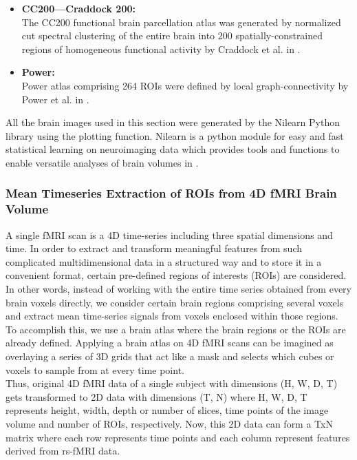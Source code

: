 \begin{itemize}
\item \textbf{CC200—Craddock 200:} \\
The CC200 functional brain parcellation atlas was generated by normalized cut
spectral clustering of the entire brain into 200 spatially-constrained regions of
homogeneous functional activity by Craddock et al. in \cite{craddock2012whole}.

\item \textbf{Power:} \\
Power atlas comprising 264 ROIs were defined by local graph-connectivity by Power
et al. in \cite{power2011functional}.
\end{itemize}

All the brain images used in this section were generated by the Nilearn Python library using
the plotting function. Nilearn is a python module for easy and fast statistical learning on
neuroimaging data which provides tools and functions to enable versatile analyses of brain
volumes in \cite{nilearn}.

\subsubsection{Mean Timeseries Extraction of ROIs from 4D fMRI Brain Volume}
A single fMRI scan is a 4D time-series including three spatial dimensions and time. In order to extract
and transform meaningful features from such complicated multidimensional data in a
structured way and to store it in a convenient format, certain pre-defined regions of interests
(ROIs) are considered.\\

In other words, instead of working with the entire time series obtained from every brain
voxels directly, we consider certain brain regions comprising several voxels and extract mean
time-series signals from voxels enclosed within those regions. To accomplish this, we use a
brain atlas where the brain regions or the ROIs are already defined. Applying a brain atlas on
4D fMRI scans can be imagined as overlaying a series of 3D grids that act like a mask and
selects which cubes or voxels to sample from at every time point.\\

Thus, original 4D fMRI data of a single subject with dimensions (H, W, D, T) gets
transformed to 2D data with dimensions (T, N) where H, W, D, T represents height, width,
depth or number of slices, time points of the image volume and number of ROIs, respectively. Now, this 2D data can form a TxN matrix where each row represents time points and each
column represent features derived from rs-fMRI data.\\

